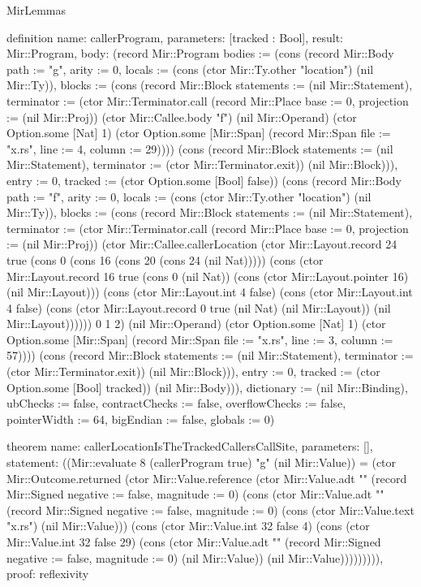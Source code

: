 \begin{lexlean}{MirLemmas}
\begin{semanticmodule}
definition{
  name: callerProgram,
  parameters: [tracked : Bool],
  result: Mir::Program,
  body: (record Mir::Program {bodies := (cons (record Mir::Body {path := "g", arity := 0, locals := (cons (ctor Mir::Ty.other "location") (nil Mir::Ty)), blocks := (cons (record Mir::Block {statements := (nil Mir::Statement), terminator := (ctor Mir::Terminator.call (record Mir::Place {base := 0, projection := (nil Mir::Proj)}) (ctor Mir::Callee.body "f") (nil Mir::Operand) (ctor Option.some [Nat] 1) (ctor Option.some [Mir::Span] (record Mir::Span {file := "x.rs", line := 4, column := 29})))}) (cons (record Mir::Block {statements := (nil Mir::Statement), terminator := (ctor Mir::Terminator.exit)}) (nil Mir::Block))), entry := 0, tracked := (ctor Option.some [Bool] false)}) (cons (record Mir::Body {path := "f", arity := 0, locals := (cons (ctor Mir::Ty.other "location") (nil Mir::Ty)), blocks := (cons (record Mir::Block {statements := (nil Mir::Statement), terminator := (ctor Mir::Terminator.call (record Mir::Place {base := 0, projection := (nil Mir::Proj)}) (ctor Mir::Callee.callerLocation (ctor Mir::Layout.record 24 true (cons 0 (cons 16 (cons 20 (cons 24 (nil Nat))))) (cons (ctor Mir::Layout.record 16 true (cons 0 (nil Nat)) (cons (ctor Mir::Layout.pointer 16) (nil Mir::Layout))) (cons (ctor Mir::Layout.int 4 false) (cons (ctor Mir::Layout.int 4 false) (cons (ctor Mir::Layout.record 0 true (nil Nat) (nil Mir::Layout)) (nil Mir::Layout)))))) 0 1 2) (nil Mir::Operand) (ctor Option.some [Nat] 1) (ctor Option.some [Mir::Span] (record Mir::Span {file := "x.rs", line := 3, column := 57})))}) (cons (record Mir::Block {statements := (nil Mir::Statement), terminator := (ctor Mir::Terminator.exit)}) (nil Mir::Block))), entry := 0, tracked := (ctor Option.some [Bool] tracked)}) (nil Mir::Body))), dictionary := (nil Mir::Binding), ubChecks := false, contractChecks := false, overflowChecks := false, pointerWidth := 64, bigEndian := false, globals := 0})
}

theorem{
  name: callerLocationIsTheTrackedCallersCallSite,
  parameters: [],
  statement: ((Mir::evaluate 8 (callerProgram true) "g" (nil Mir::Value)) = (ctor Mir::Outcome.returned (ctor Mir::Value.reference (ctor Mir::Value.adt "" (record Mir::Signed {negative := false, magnitude := 0}) (cons (ctor Mir::Value.adt "" (record Mir::Signed {negative := false, magnitude := 0}) (cons (ctor Mir::Value.text "x.rs") (nil Mir::Value))) (cons (ctor Mir::Value.int 32 false 4) (cons (ctor Mir::Value.int 32 false 29) (cons (ctor Mir::Value.adt "" (record Mir::Signed {negative := false, magnitude := 0}) (nil Mir::Value)) (nil Mir::Value))))))))),
  proof: reflexivity{}
}


\end{semanticmodule}
\end{lexlean}

